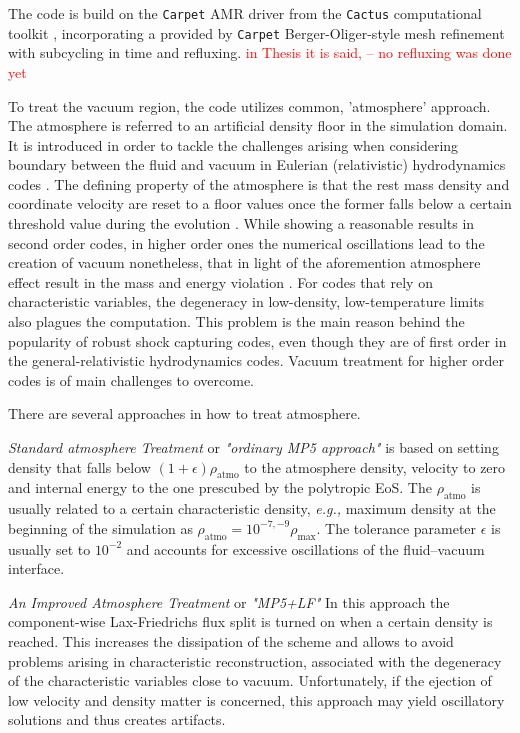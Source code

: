 \documentclass[11pt,a4paper,headinclude=true,DIV=14,BCOR=8mm,chapterprefix,listof=totoc,twoside,openright,abstracton]{scrbook}
\begin{document}
The code is build on the \texttt{Carpet} AMR driver \cite{Schnetter:2003rb} from the \texttt{Cactus} computational toolkit \cite{Goodale:2003}, incorporating a provided by \texttt{Carpet} Berger-Oliger-style mesh refinement \cite{Berger:1989,Berger:1984} with subcycling in time and refluxing. \textcolor{red}{in Thesis it is said, -- no refluxing was done yet}

To treat the vacuum region, the code utilizes common, 'atmosphere' approach. The atmosphere is referred to an artificial density floor in the simulation domain. It is introduced in order to tackle the challenges arising when considering boundary between the fluid and vacuum in Eulerian (relativistic) hydrodynamics codes \cite{Galeazzi:mThesis:2008,Kastaun:2006,Millmore:2009dk}. 
The defining property of the atmosphere is that the rest mass density and coordinate velocity are reset to a floor values once the former falls below a certain threshold value during the evolution \cite{Font:2001ew,Baiotti:2004wn}. While showing a reasonable results in second order codes, in higher order ones the numerical oscillations lead to the creation of vacuum nonetheless, that in light of the aforemention atmosphere effect result in the mass and energy violation \cite{Radice:2011qr}. For codes that rely on characteristic variables, the degeneracy in low-density, low-temperature limits also plagues the computation. This problem is the main reason behind the popularity of robust shock capturing codes, even though they are of first order in the general-relativistic hydrodynamics codes. Vacuum treatment for higher order codes is of main challenges to overcome.

There are several approaches in how to treat atmosphere. 

\textit{Standard atmosphere Treatment} or \textit{"ordinary MP5 approach"} is based on setting density that falls below $(1+\epsilon)\rho_{\text{atmo}}$ to the atmosphere density, velocity to zero and internal energy to the one prescubed by the polytropic EoS. The $\rho_{\text{atmo}}$ is usually related to a certain characteristic density, \textit{e.g.,} maximum density at the beginning of the simulation as $\rho_{\text{atmo}} = 10^{-7,-9}\rho_{\text{max}}$. The tolerance parameter $\epsilon$ is usually set to $10^{-2}$ and accounts for excessive oscillations of the fluid–vacuum interface. 

\textit{An Improved Atmosphere Treatment} or \textit{"MP5+LF"} In this approach the component-wise Lax-Friedrichs flux split is turned on when a certain density is reached. This increases the dissipation of the scheme and allows to avoid problems arising in characteristic reconstruction, associated with the degeneracy of the characteristic variables close to vacuum. Unfortunately, if the ejection of low velocity and density matter is concerned, this approach may yield oscillatory solutions and thus creates artifacts. 
\end{document}
